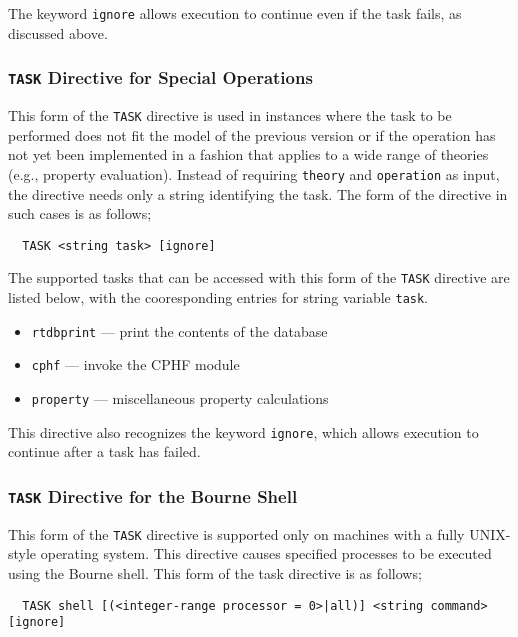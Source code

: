 The keyword \verb+ignore+ allows execution to continue even if the
task fails, as discussed above.

\subsubsection{{\tt TASK} Directive for Special Operations}

This form of the \verb+TASK+ directive is used in instances where the
task to be performed does not fit the model of the previous version or
if the operation has not yet been implemented in a fashion that
applies to a wide range of theories (e.g., property evaluation).
Instead of requiring \verb+theory+ and \verb+operation+ as input, the
directive needs only a string identifying the task.  The form of the
directive in such cases is as follows;

\begin{verbatim}
  TASK <string task> [ignore]
\end{verbatim}

The supported tasks that can be accessed with this form of the \verb+TASK+
directive are listed
below, with the cooresponding entries for string variable \verb+task+.

\begin{itemize}
  \item \verb+rtdbprint+ --- print the contents of the database
  \item \verb+cphf+ --- invoke the CPHF module
  \item \verb+property+ --- miscellaneous property calculations
\end{itemize}

This directive also recognizes the keyword \verb+ignore+, which allows
execution to continue after a task has failed.

\subsubsection{{\tt TASK} Directive for the Bourne Shell}

This form of the \verb+TASK+ directive is supported only on machines
with a fully UNIX-style operating system.  This directive causes
specified processes to be executed using the Bourne shell.  This form
of the task directive is as follows;

\begin{verbatim}
  TASK shell [(<integer-range processor = 0>|all)] <string command> [ignore]
\end{verbatim}

